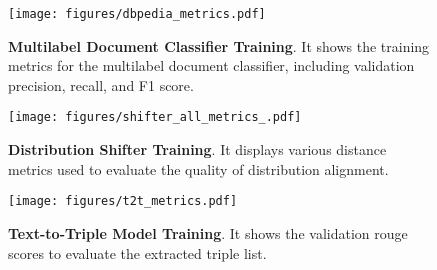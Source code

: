 \begin{figure*}[t]
    \centering
    \begin{subfigure}
        \centering
        \texttt{[image: figures/dbpedia\_metrics.pdf]}
        \vspace{-2em}
        \caption{\textbf{Multilabel Document Classifier Training}. It shows the training metrics for the multilabel document classifier, including validation precision, recall, and F1 score.}
        \label{fig:classifier_train}
    \end{subfigure}
    \vspace{2em}  %
    
    \begin{subfigure}
        \centering
        \texttt{[image: figures/shifter\_all\_metrics\_.pdf]}
        \vspace{-2em}
        \caption{\textbf{Distribution Shifter Training}. It displays various distance metrics used to evaluate the quality of distribution alignment.}
        \label{fig:shifter_train}
    \end{subfigure}
    \vspace{2em}

    \begin{subfigure}
        \centering
        \texttt{[image: figures/t2t\_metrics.pdf]}
        \vspace{-2em}
        \caption{\textbf{Text-to-Triple Model Training}. It shows the validation rouge scores to evaluate the extracted triple list.}
        \label{fig:t2t_train}
    \end{subfigure}
    \label{fig:training_reports}
\end{figure*}